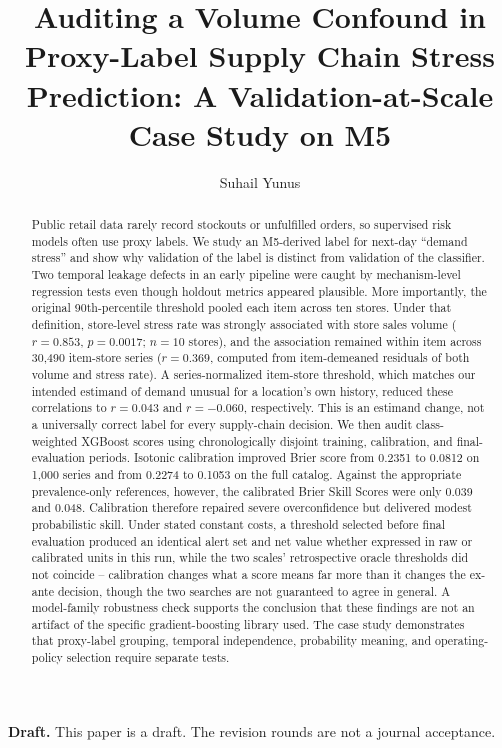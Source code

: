 \documentclass[11pt]{article}
\title{Auditing a Volume Confound in Proxy-Label Supply Chain Stress Prediction: A Validation-at-Scale Case Study on M5}
\author[1]{Suhail Yunus}
\affil[1]{Independent Researcher}
\date{}
\begin{document}
\maketitle

\begin{center}
\textbf{Draft.} This paper is a draft. The revision rounds are not a journal acceptance.
\end{center}

\begin{abstract}
Public retail data rarely record stockouts or unfulfilled orders, so supervised risk models often use proxy labels. We study an M5-derived label for next-day ``demand stress'' and show why validation of the label is distinct from validation of the classifier. Two temporal leakage defects in an early pipeline were caught by mechanism-level regression tests even though holdout metrics appeared plausible. More importantly, the original 90th-percentile threshold pooled each item across ten stores. Under that definition, store-level stress rate was strongly associated with store sales volume ($r=0.853$, $p=0.0017$; $n=10$ stores), and the association remained within item across 30{,}490 item-store series ($r=0.369$, computed from item-demeaned residuals of both volume and stress rate). A series-normalized item-store threshold, which matches our intended estimand of demand unusual for a location's own history, reduced these correlations to $r=0.043$ and $r=-0.060$, respectively. This is an estimand change, not a universally correct label for every supply-chain decision. We then audit class-weighted XGBoost scores using chronologically disjoint training, calibration, and final-evaluation periods. Isotonic calibration improved Brier score from 0.2351 to 0.0812 on 1{,}000 series and from 0.2274 to 0.1053 on the full catalog. Against the appropriate prevalence-only references, however, the calibrated Brier Skill Scores were only 0.039 and 0.048. Calibration therefore repaired severe overconfidence but delivered modest probabilistic skill. Under stated constant costs, a threshold selected before final evaluation produced an identical alert set and net value whether expressed in raw or calibrated units in this run, while the two scales' retrospective oracle thresholds did not coincide -- calibration changes what a score means far more than it changes the ex-ante decision, though the two searches are not guaranteed to agree in general. A model-family robustness check supports the conclusion that these findings are not an artifact of the specific gradient-boosting library used. The case study demonstrates that proxy-label grouping, temporal independence, probability meaning, and operating-policy selection require separate tests.
\end{abstract}
\end{document}
